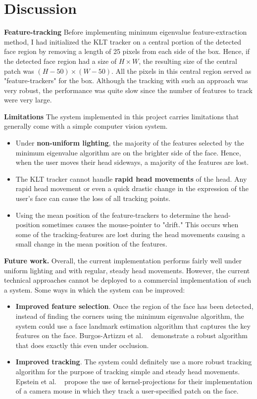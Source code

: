 \section{Discussion}
\label{sec:discussion}

\textbf{Feature-tracking} Before implementing minimum eigenvalue feature-extraction method, I had initialized the KLT tracker on a central portion of the detected face region by removing a length of 25 pixels from each side of the box. Hence, if the detected face region had a size of $H \times W$, the resulting size of the central patch was $(H-50) \times (W-50)$. All the pixels in this central region served as "feature-trackers" for the box. Although the tracking with such an approach was very robust, the performance was quite slow since the number of features to track were very large.

\textbf{Limitations} The system implemented in this project carries limitations that generally come with a simple computer vision system.
\begin{itemize}
	\item Under \textbf{non-uniform lighting}, the majority of the features selected by the minimum eigenvalue algorithm are on the brighter side of the face. Hence, when the user moves their head sideways, a majority of the features are lost. 
	\item The KLT tracker cannot handle \textbf{rapid head movements} of the head. Any rapid head movement or even a quick drastic change in the expression of the user's face can cause the loss of all tracking points.
	\item Using the mean position of the feature-trackers to determine the head-position sometimes causes the mouse-pointer to "drift." This occurs when some of the tracking-features are lost during the head movements causing a small change in the mean position of the features.
\end{itemize}

\textbf{Future work.} Overall, the current implementation performs fairly well under uniform lighting and with regular, steady head movements. However, the current technical approaches cannot be deployed to a commercial implementation of such a system. Some ways in which the system can be improved:
\begin{itemize}
	\item \textbf{Improved feature selection}. Once the region of the face has been detected, instead of finding the corners using the minimum eigenvalue algorithm, the system could use a face landmark estimation algorithm that captures the key features on the face. Burgos-Artizzu et al. ~\cite{burgos2013robust} demonstrate a robust algorithm that does exactly this even under occlusion.
	\item \textbf{Improved tracking}. The system could definitely use a more robust tracking algorithm for the purpose of tracking simple and steady head movements. Epstein et al. ~\cite{epstein2014using} propose the use of kernel-projections for their implementation of a camera mouse in which they track a user-specified patch on the face.
\end{itemize}



